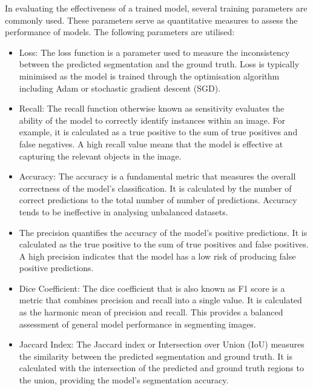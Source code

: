 In evaluating the effectiveness of a trained model, several training parameters are commonly used. These parameters serve as quantitative measures to assess the performance of models. The following parameters are utilised:
\begin{itemize}
    \item Loss: The loss function is a parameter used to measure the inconsistency between the predicted segmentation and the ground truth. Loss is typically minimised as the model is trained through the optimisation algorithm including Adam or stochastic gradient descent (SGD).

    \item Recall: The recall function otherwise known as sensitivity evaluates the ability of the model to correctly identify instances within an image. For example, it is calculated as a true positive to the sum of true positives and false negatives. A high recall value means that the model is effective at capturing the relevant objects in the image.

    \item Accuracy: The accuracy is a fundamental metric that measures the overall correctness of the model's classification. It is calculated by the number of correct predictions to the total number of number of predictions. Accuracy tends to be ineffective in analysing unbalanced datasets.

    \item The precision quantifies the accuracy of the model's positive predictions. It is calculated as the true positive to the sum of true positives and false positives. A high precision indicates that the model has a low risk of producing false positive predictions.

    \item Dice Coefficient: The dice coefficient that is also known as F1 score is a metric that combines precision and recall into a single value. It is calculated as the harmonic mean of precision and recall. This provides a balanced assessment of general model performance in segmenting images.

    \item Jaccard Index: The Jaccard index or Intersection over Union (IoU) measures the similarity between the predicted segmentation and ground truth. It is calculated with the intersection of the predicted and ground truth regions to the union, providing the model's segmentation accuracy.
\end{itemize}

